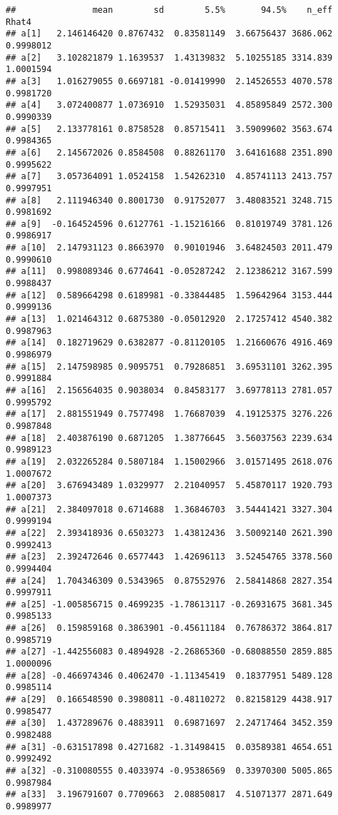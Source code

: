 \documentclass[
]{article}
\begin{document}
\begin{verbatim}
##               mean        sd        5.5%       94.5%    n_eff     Rhat4
## a[1]   2.146146420 0.8767432  0.83581149  3.66756437 3686.062 0.9998012
## a[2]   3.102821879 1.1639537  1.43139832  5.10255185 3314.839 1.0001594
## a[3]   1.016279055 0.6697181 -0.01419990  2.14526553 4070.578 0.9981720
## a[4]   3.072400877 1.0736910  1.52935031  4.85895849 2572.300 0.9990339
## a[5]   2.133778161 0.8758528  0.85715411  3.59099602 3563.674 0.9984365
## a[6]   2.145672026 0.8584508  0.88261170  3.64161688 2351.890 0.9995622
## a[7]   3.057364091 1.0524158  1.54262310  4.85741113 2413.757 0.9997951
## a[8]   2.111946340 0.8001730  0.91752077  3.48083521 3248.715 0.9981692
## a[9]  -0.164524596 0.6127761 -1.15216166  0.81019749 3781.126 0.9986917
## a[10]  2.147931123 0.8663970  0.90101946  3.64824503 2011.479 0.9990610
## a[11]  0.998089346 0.6774641 -0.05287242  2.12386212 3167.599 0.9988437
## a[12]  0.589664298 0.6189981 -0.33844485  1.59642964 3153.444 0.9999136
## a[13]  1.021464312 0.6875380 -0.05012920  2.17257412 4540.382 0.9987963
## a[14]  0.182719629 0.6382877 -0.81120105  1.21660676 4916.469 0.9986979
## a[15]  2.147598985 0.9095751  0.79286851  3.69531101 3262.395 0.9991884
## a[16]  2.156564035 0.9038034  0.84583177  3.69778113 2781.057 0.9995792
## a[17]  2.881551949 0.7577498  1.76687039  4.19125375 3276.226 0.9987848
## a[18]  2.403876190 0.6871205  1.38776645  3.56037563 2239.634 0.9989123
## a[19]  2.032265284 0.5807184  1.15002966  3.01571495 2618.076 1.0007672
## a[20]  3.676943489 1.0329977  2.21040957  5.45870117 1920.793 1.0007373
## a[21]  2.384097018 0.6714688  1.36846703  3.54441421 3327.304 0.9999194
## a[22]  2.393418936 0.6503273  1.43812436  3.50092140 2621.390 0.9992413
## a[23]  2.392472646 0.6577443  1.42696113  3.52454765 3378.560 0.9994404
## a[24]  1.704346309 0.5343965  0.87552976  2.58414868 2827.354 0.9997911
## a[25] -1.005856715 0.4699235 -1.78613117 -0.26931675 3681.345 0.9985133
## a[26]  0.159859168 0.3863901 -0.45611184  0.76786372 3864.817 0.9985719
## a[27] -1.442556083 0.4894928 -2.26865360 -0.68088550 2859.885 1.0000096
## a[28] -0.466974346 0.4062470 -1.11345419  0.18377951 5489.128 0.9985114
## a[29]  0.166548590 0.3980811 -0.48110272  0.82158129 4438.917 0.9985477
## a[30]  1.437289676 0.4883911  0.69871697  2.24717464 3452.359 0.9982488
## a[31] -0.631517898 0.4271682 -1.31498415  0.03589381 4654.651 0.9992492
## a[32] -0.310080555 0.4033974 -0.95386569  0.33970300 5005.865 0.9987984
## a[33]  3.196791607 0.7709663  2.08850817  4.51071377 2871.649 0.9989977

\end{verbatim}
\end{document}
